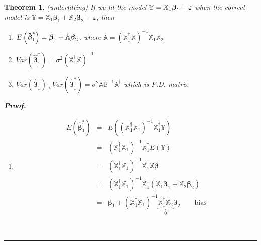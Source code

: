 \documentclass{article}
\newtheorem{theorem}{Theorem}
\newenvironment{proof}[1][Proof]{\noindent\textbf{#1.} }{\ \rule{0.5em}{0.5em}}
\begin{document}
\begin{theorem}
(underfitting) If we fit the model $\mathbb{Y}=\mathbb{X}_{1}\boldsymbol{%
\beta }_{1}+\boldsymbol{\varepsilon }$ when the correct model is $\mathbb{Y}=%
\mathbb{X}_{1}\boldsymbol{\beta }_{1}+\mathbb{X}_{2}\boldsymbol{\beta }_{2}+%
\boldsymbol{\varepsilon }$, then

\begin{enumerate}
\item $E\left( \boldsymbol{\hat{\beta}}_{1}^{\ast }\right) =\boldsymbol{%
\beta }_{1}+\mathbb{A}\boldsymbol{\beta }_{2}$, where $\mathbb{A}=\left( 
\mathbb{X}_{1}^{\dagger }\mathbb{X}\right) ^{-1}\mathbb{X}_{1}\mathbb{X}_{2}$

\item $Var\left( \boldsymbol{\hat{\beta}}_{1}^{\ast }\right) =\sigma
^{2}\left( \mathbb{X}_{1}^{\dagger }\mathbb{X}\right) ^{-1}$

\item $Var\left( \boldsymbol{\hat{\beta}}_{1}\right) \underset{\geq }{-}%
Var\left( \boldsymbol{\hat{\beta}}_{1}^{\ast }\right) =\sigma ^{2}\mathbb{AB}%
^{-1}\mathbb{A}^{\dagger }$ which is P.D. matrix
\end{enumerate}

\begin{proof}
\begin{enumerate}
\item 
\begin{eqnarray*}
E\left( \boldsymbol{\hat{\beta}}_{1}^{\ast }\right) &=&E\left( \left( 
\mathbb{X}_{1}^{\dagger }\mathbb{X}_{1}\right) ^{-1}\mathbb{X}_{1}^{\dagger }%
\mathbb{Y}\right) \\
&=&\left( \mathbb{X}_{1}^{\dagger }\mathbb{X}_{1}\right) ^{-1}\mathbb{X}%
_{1}^{\dagger }E\left( \mathbb{Y}\right) \\
&=&\left( \mathbb{X}_{1}^{\dagger }\mathbb{X}_{1}\right) ^{-1}\mathbb{X}%
_{1}^{\dagger }\mathbb{X}\boldsymbol{\beta } \\
&=&\left( \mathbb{X}_{1}^{\dagger }\mathbb{X}_{1}\right) ^{-1}\mathbb{X}%
_{1}^{\dagger }\left( \mathbb{X}_{1}\boldsymbol{\beta }_{1}+\mathbb{X}_{2}%
\boldsymbol{\beta }_{2}\right) \\
&=&\boldsymbol{\beta }_{1}+\left( \mathbb{X}_{1}^{\dagger }\mathbb{X}%
_{1}\right) ^{-1}\underset{0}{\underbrace{\mathbb{X}_{1}^{\dagger }\mathbb{X}%
_{2}}}\boldsymbol{\beta }_{2}\quad \quad \text{bias}
\end{eqnarray*}


\end{enumerate}
\end{proof}
\end{theorem}
\end{document}
